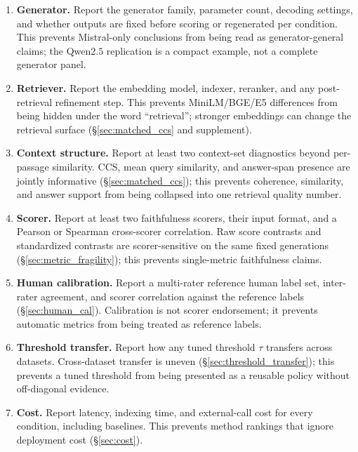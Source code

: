 \begin{enumerate}
  \item \textbf{Generator.} Report the generator family, parameter
        count, decoding settings, and whether outputs are fixed before
        scoring or regenerated per condition. This prevents
        Mistral-only conclusions from being read as generator-general
        claims; the Qwen$2.5$ replication is a compact example, not a
        complete generator panel.
  \item \textbf{Retriever.} Report the embedding model, indexer,
        reranker, and any post-retrieval refinement step. This prevents
        MiniLM/BGE/E5 differences from being hidden under the word
        ``retrieval''; stronger embeddings can change the retrieval
        surface (\S\ref{sec:matched_ccs} and supplement).
  \item \textbf{Context structure.} Report at least two context-set
        diagnostics beyond per-passage similarity. CCS, mean query
        similarity, and answer-span presence are jointly informative
        (\S\ref{sec:matched_ccs}); this prevents coherence, similarity,
        and answer support from being collapsed into one retrieval
        quality number.
  \item \textbf{Scorer.} Report at least two faithfulness scorers, their
        input format, and a Pearson or Spearman cross-scorer
        correlation. Raw score contrasts and standardized contrasts are
        scorer-sensitive on the same fixed generations
        (\S\ref{sec:metric_fragility}); this prevents single-metric
        faithfulness claims.
  \item \textbf{Human calibration.} Report a multi-rater reference human
        label set, inter-rater agreement, and scorer correlation against
        the reference labels (\S\ref{sec:human_cal}). Calibration is not
        scorer endorsement; it prevents automatic metrics from being
        treated as reference labels.
  \item \textbf{Threshold transfer.} Report how any tuned threshold
        $\tau$ transfers across datasets. Cross-dataset transfer is
        uneven (\S\ref{sec:threshold_transfer}); this prevents a tuned
        threshold from being presented as a reusable policy without
        off-diagonal evidence.
  \item \textbf{Cost.} Report latency, indexing time, and external-call
        cost for every condition, including baselines. This prevents
        method rankings that ignore deployment cost
        (\S\ref{sec:cost}).
\end{enumerate}

